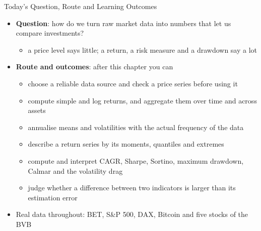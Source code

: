 \begin{frame}{Today's Question, Route and Learning Outcomes}
\itemsize{\small}
\begin{itemize}
    \item \textbf{Question}: how do we turn raw market data into numbers that let us compare investments?
    \begin{itemize}
        \item a price level says little; a return, a risk measure and a drawdown say a lot
    \end{itemize}
    \item \textbf{Route and outcomes}: after this chapter you can
    \begin{itemize}
        \item choose a reliable data source and check a price series before using it
        \item compute simple and log returns, and aggregate them over time and across assets
        \item annualise means and volatilities with the actual frequency of the data
        \item describe a return series by its moments, quantiles and extremes
        \item compute and interpret CAGR, Sharpe, Sortino, maximum drawdown, Calmar and the volatility drag
        \item judge whether a difference between two indicators is larger than its estimation error
    \end{itemize}
    \item Real data throughout: BET, S\&P 500, DAX, Bitcoin and five stocks of the BVB
\end{itemize}
\end{frame}

